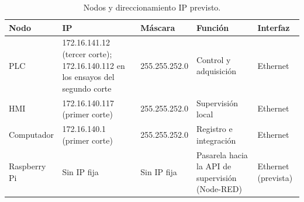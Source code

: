 \begin{table}[H]
\centering
\small
\caption{Nodos y direccionamiento IP previsto.}
\label{tab:nodos_ip}
\begin{tabularx}{\textwidth}{L{2.8cm}L{2.7cm}L{2.7cm}YL{2.3cm}}
\toprule
\textbf{Nodo} & \textbf{IP} & \textbf{Máscara} & \textbf{Función} & \textbf{Interfaz} \\
\midrule
PLC & 172.16.141.12 (tercer corte); 172.16.140.112 en los ensayos del segundo corte & 255.255.252.0 & Control y adquisición & Ethernet \\
HMI & 172.16.140.117 (primer corte) & 255.255.252.0 & Supervisión local & Ethernet \\
Computador & 172.16.140.1 (primer corte) & 255.255.252.0 & Registro e integración & Ethernet \\
Raspberry Pi & Sin IP fija & Sin IP fija & Pasarela hacia la API de supervisión (Node-RED) & Ethernet (prevista) \\
\bottomrule
\end{tabularx}
\end{table}
